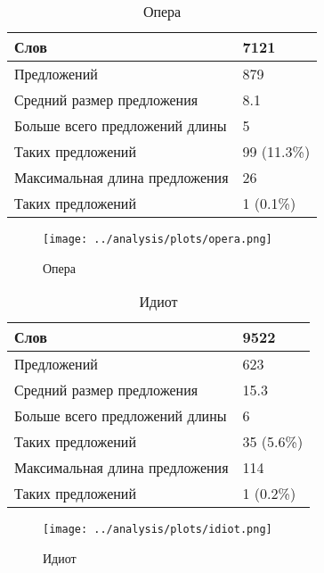 \documentclass{kursa4}
\begin{document}
      \begin{samepage} %
        \begin{table}[ht]
          \centering     
          \tablehead{} %
          \begin{tabular}[height=5cm]{|m{10cm}|m{3cm}|}
            \hline
            Слов & 7121\\\hline
            Предложений & 879\\\hline
            Средний размер предложения & 8.1\\\hline
            Больше всего предложений длины & 5\\\hline
            Таких предложений & 99 (11.3\%)\\\hline
            Максимальная длина предложения & 26\\\hline
            Таких предложений & 1 (0.1\%)\\\hline
          \end{tabular}
          \caption{Опера}
        \end{table} 
        
        \begin{figure}[!h] \centering
          \texttt{[image: ../analysis/plots/opera.png]}
          \caption{Опера}
        \end{figure}
      \end{samepage}


      \begin{table}
        \centering
        \tablehead{}
        \begin{tabular}{|m{10cm}|m{3cm}|}
          \hline
          Слов & 9522\\\hline
          Предложений & 623\\\hline
          Средний размер предложения & 15.3\\\hline
          Больше всего предложений длины & 6\\\hline
          Таких предложений & 35 (5.6\%)\\\hline
          Максимальная длина предложения & 114\\\hline
          Таких предложений & 1 (0.2\%)\\\hline
        \end{tabular}
        \caption{Идиот}
      \end{table}

      \begin{figure}[htbp] \centering
        \texttt{[image: ../analysis/plots/idiot.png]}
        \caption{Идиот}
      \end{figure}
\end{document}
